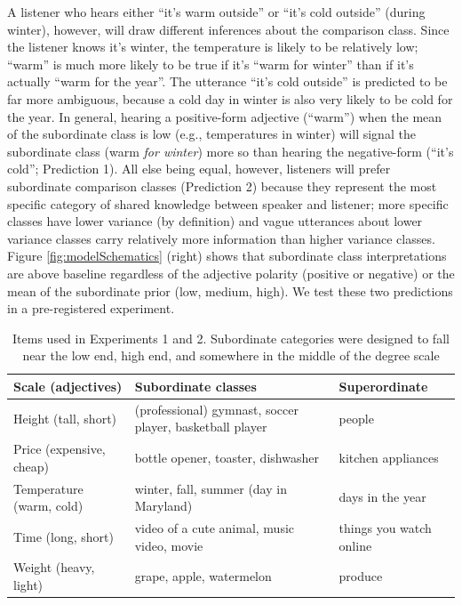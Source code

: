 \documentclass[doc]{apa6}
\begin{document}
A listener who hears either ``it's warm outside'' or ``it's
cold outside'' (during winter), however, will draw different inferences
about the comparison class. Since the listener knows it's winter, the
temperature is likely to be relatively low; ``warm'' is much more
likely to be true if it's ``warm for winter'' than if it's
actually ``warm for the year''. The utterance ``it's cold
outside'' is predicted to be far more ambiguous, because a cold day in
winter is also very likely to be cold for the year. In general, hearing
a positive-form adjective (``warm'') when the mean of the
subordinate class is low (e.g., temperatures in winter) will signal the
subordinate class (warm \emph{for winter}) more so than hearing the
negative-form (``it's cold''; Prediction 1). All else being equal,
however, listeners will prefer subordinate comparison classes
(Prediction 2) because they represent the most specific category of
shared knowledge between speaker and listener; more specific classes
have lower variance (by definition) and vague utterances about lower
variance classes carry relatively more information than higher variance
classes. Figure \ref{fig:modelSchematics} (right) shows that subordinate
class interpretations are above baseline regardless of the adjective
polarity (positive or negative) or the mean of the subordinate prior
(low, medium, high). We test these two predictions in a pre-registered
experiment.

\begin{table}[ht]
\centering
\begin{tabularx}{\textwidth}{lll}
  \hline
Scale (adjectives) & Subordinate classes & Superordinate \\ 
  \hline
Height (tall, short) & (professional) gymnast, soccer player, basketball player & people \\ 
  Price (expensive, cheap) & bottle opener, toaster, dishwasher & kitchen appliances \\ 
  Temperature (warm, cold) & winter, fall, summer (day in Maryland) & days in the year \\ 
  Time (long, short) & video of a cute animal, music video, movie & things you watch online \\ 
  Weight (heavy, light) & grape, apple, watermelon & produce \\ 
   \hline
\end{tabularx}
\caption{Items used in Experiments 1 and 2. Subordinate categories were designed to fall near the low end, high end, and somewhere in the middle of the degree scale} 
\label{tab:1}
\end{table}
\end{document}
